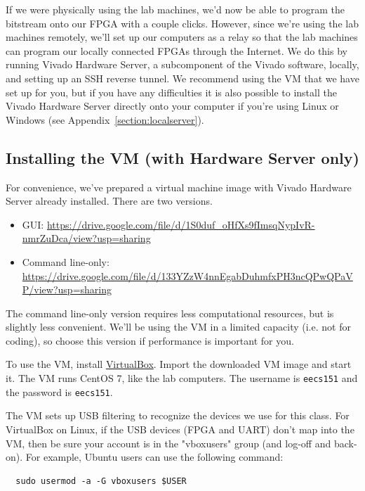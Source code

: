 \documentclass[11pt]{article}
\begin{document}
If we were physically using the lab machines, we'd now be able to program the bitstream onto our FPGA with a couple clicks. However, since we're using the lab machines remotely, we'll set up our computers as a relay so that the lab machines can program our locally connected FPGAs through the Internet. We do this by running Vivado Hardware Server, a subcomponent of the Vivado software, locally, and setting up an SSH reverse tunnel. We recommend using the VM that we have set up for you, but if you have any difficulties it is also possible to install the Vivado Hardware Server directly onto your computer if you're using Linux or Windows (see Appendix~\ref{section:localserver}).

\subsection{Installing the VM (with Hardware Server only)}
\label{section:vm}
For convenience, we've prepared a virtual machine image with Vivado Hardware Server already installed. There are two versions.

\begin{itemize}
\item GUI: \url{https://drive.google.com/file/d/1S0duf_oHfXs9fImsqNypIvR-nmrZuDca/view?usp=sharing}
\item Command line-only: \url{https://drive.google.com/file/d/133YZzW4nnEgabDuhmfxPH3ncQPwQPaVP/view?usp=sharing}
\end{itemize}

The command line-only version requires less computational resources, but is slightly less convenient. We'll be using the VM in a limited capacity (i.e. not for coding), so choose this version if performance is important for you.

To use the VM, install \href{https://www.virtualbox.org/}{VirtualBox}. Import the downloaded VM image and start it. The VM runs CentOS 7, like the lab computers. The username is \texttt{eecs151} and the password is \texttt{eecs151}.

The VM sets up USB filtering to recognize the devices we use for this class. For VirtualBox on Linux, if the USB devices (FPGA and UART) don't map into the VM, then be sure your account is in the "vboxusers" group (and log-off and back-on). For example, Ubuntu users can use the following command:

\begin{verbatim}
  sudo usermod -a -G vboxusers $USER
\end{verbatim}
\end{document}
